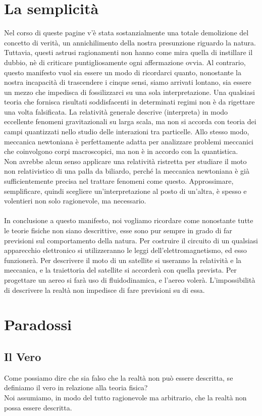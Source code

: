 \documentclass[]{article}
\begin{document}
	\section{La semplicità}
	Nel corso di queste pagine v'è stata sostanzialmente una totale demolizione del concetto di verità, un annichilimento della nostra presunzione riguardo la natura. Tuttavia, questi astrusi ragionamenti non hanno come mira quella di instillare il dubbio, nè di criticare puntigliosamente ogni affermazione ovvia. Al contrario, questo manifesto vuol sia essere un modo di ricordarci quanto, nonostante la nostra incapacità di trascendere i cinque sensi, siamo arrivati lontano, sia essere un mezzo che impedisca di fossilizzarci su una sola interpretazione. Una qualsiasi teoria che fornisca risultati soddisfacenti in determinati regimi non è da rigettare una volta falsificata. La relatività generale descrive (interpreta) in modo eccellente fenomeni gravitazionali su larga scala, ma non si accorda con teoria dei campi quantizzati nello studio delle interazioni tra particelle. Allo stesso modo, meccanica newtoniana è perfettamente adatta per analizzare problemi meccanici che coinvolgono corpi macroscopici, ma non è in accordo con la quantistica.\\
	Non avrebbe alcun senso applicare una relatività ristretta per studiare il moto non relativistico di una palla da biliardo, perché la meccanica newtoniana è già sufficientemente precisa nel trattare fenomeni come questo. Approssimare, semplificare, quindi scegliere un'interpretazione al posto di un'altra, è spesso e volentieri non solo ragionevole, ma necessario.\\
	\\
	In conclusione a questo manifesto, noi vogliamo ricordare come nonostante tutte le teorie fisiche non siano descrittive, esse sono pur sempre in grado di far previsioni sul comportamento della natura. Per costruire il circuito di un qualsiasi apparecchio elettronico si utilizzeranno le leggi dell'elettromagnetismo, ed esso funzionerà. Per descrivere il moto di un satellite si useranno la relatività e la meccanica, e la traiettoria del satellite si accorderà con quella prevista. Per progettare un aereo si farà uso di fluidodinamica, e l'aereo volerà.  
	L'impossibilità di descrivere la realtà non impedisce di fare previsioni su di essa.
	\section{Paradossi}
	\subsection{Il Vero}
	Come possiamo dire che sia falso che la realtà non può essere descritta, se definiamo il vero in relazione alla teoria fisica?\\
	Noi assumiamo, in modo del tutto ragionevole ma arbitrario, che la realtà non possa essere descritta.
\end{document}
